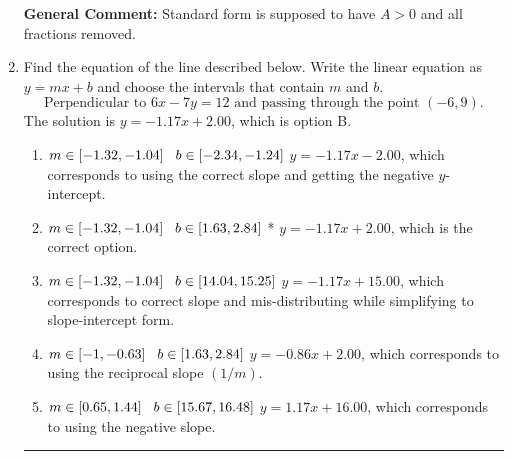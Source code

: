 \documentclass{extbook}[14pt]
\newcommand{\litem}[1]{\item #1

\rule{\textwidth}{0.4pt}}
\begin{document}
\begin{enumerate}
{\textbf{General Comment:} Standard form is supposed to have $A > 0$ and all fractions removed.
}
\litem{
Find the equation of the line described below. Write the linear equation as $ y=mx+b $ and choose the intervals that contain $m$ and $b$.
\[ \text{Perpendicular to } 6 x - 7 y = 12 \text{ and passing through the point } (-6, 9). \]
The solution is \( y = -1.17x + 2.00 \), which is option B.\begin{enumerate}[label=\Alph*.]
\item \( m \in [-1.32, -1.04] \hspace*{3mm} b \in [-2.34, -1.24] \)
 $y = -1.17x - 2.00$, which corresponds to using the correct slope and getting the negative $y$-intercept.
\item \( m \in [-1.32, -1.04] \hspace*{3mm} b \in [1.63, 2.84] \)
* $y = -1.17x + 2.00$, which is the correct option.
\item \( m \in [-1.32, -1.04] \hspace*{3mm} b \in [14.04, 15.25] \)
 $y = -1.17x + 15.00$, which corresponds to correct slope and mis-distributing while simplifying to slope-intercept form.
\item \( m \in [-1, -0.63] \hspace*{3mm} b \in [1.63, 2.84] \)
 $y = -0.86x + 2.00$, which corresponds to using the reciprocal slope $(1/m)$.
\item \( m \in [0.65, 1.44] \hspace*{3mm} b \in [15.67, 16.48] \)
 $y = 1.17x + 16.00$, which corresponds to using the negative slope.
\end{enumerate}

}
\end{enumerate}
\end{document}
